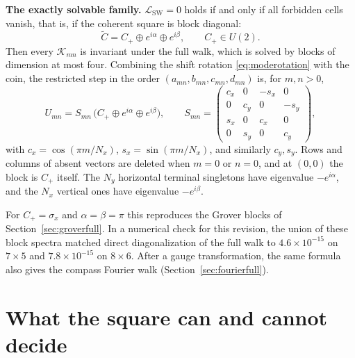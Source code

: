 \documentclass[11pt,a4paper,oneside]{report}
\newcommand{\sw}{\mathrm{SW}}
\numberwithin{equation}{chapter}
\begin{document}
\textbf{The exactly solvable family.} \(\mathcal L_{\sw}=0\) holds if and
only if all forbidden cells vanish, that is, if the coherent square is
block diagonal:
\begin{equation}
\widetilde C=C_+\oplus e^{i\alpha}\oplus e^{i\beta},\qquad C_+\in U(2).
\end{equation}
Then every \(\mathcal K_{mn}\) is invariant under the full walk, which is
solved by blocks of dimension at most four. Combining the shift rotation
\eqref{eq:moderotation} with the coin, the restricted step in the order
\((a_{mn},b_{mn},c_{mn},d_{mn})\) is, for \(m,n>0\),
\begin{equation}
\boxed{U_{mn}=S_{mn}\,\big(C_+\oplus e^{i\alpha}\oplus e^{i\beta}\big),
\qquad
S_{mn}=\begin{pmatrix}
c_x&0&-s_x&0\\0&c_y&0&-s_y\\s_x&0&c_x&0\\0&s_y&0&c_y
\end{pmatrix},}
\label{eq:generalblock}
\end{equation}
with \(c_x=\cos(\pi m/N_x)\), \(s_x=\sin(\pi m/N_x)\), and similarly
\(c_y,s_y\). Rows and columns of absent vectors are deleted when \(m=0\)
or \(n=0\), and at \((0,0)\) the block is \(C_+\) itself. The \(N_y\)
horizontal terminal singletons have eigenvalue \(-e^{i\alpha}\), and the
\(N_x\) vertical ones have eigenvalue \(-e^{i\beta}\).

For \(C_+=\sigma_x\) and \(\alpha=\beta=\pi\) this reproduces the Grover
blocks of Section~\ref{sec:groverfull}. In a numerical check for this
revision, the union of these block spectra matched direct diagonalization
of the full walk to \(4.6\times10^{-15}\) on \(7\times5\) and
\(7.8\times10^{-15}\) on \(8\times6\). After a gauge transformation, the
same formula also gives the compass Fourier walk
(Section~\ref{sec:fourierfull}).

\section{What the square can and cannot decide}
\label{sec:squarelimits}
\end{document}
